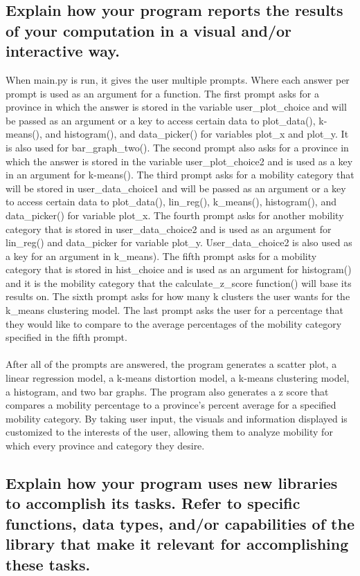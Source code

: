 \documentclass[fontsize=11pt]{article}
\begin{document}
    \subsection{Explain how your program reports the results of your computation in a visual and/or interactive way.
    }
    When main.py is run, it gives the user multiple prompts. Where each answer per prompt is used as an argument for a function. The first prompt asks for a province in which the answer is stored in the variable user\_plot\_choice and will be passed as an argument or a key to access certain data to plot\_data(), k-means(), and histogram(), and data\_picker() for variables plot\_x and plot\_y. It is also used for bar\_graph\_two(). The second prompt also asks for a province in which the answer is stored in the variable user\_plot\_choice2 and is used as a key in an argument for k-means(). The third prompt asks for a mobility category that will be stored in user\_data\_choice1 and will be passed as an argument or a key to access certain data to plot\_data(), lin\_reg(), k\_means(), histogram(), and data\_picker() for variable plot\_x. The fourth prompt asks for another mobility category that is stored in user\_data\_choice2 and is used as an argument for lin\_reg() and data\_picker for variable plot\_y. User\_data\_choice2 is also used as a key for an argument in k\_means). The fifth prompt asks for a mobility category that is stored in hist\_choice and is used as an argument for histogram() and it is the mobility category that the calculate\_z\_score function() will base its results on. The sixth prompt asks for how many k clusters the user wants for the k\_means clustering model. The last prompt asks the user for a percentage that they would like to compare to the average percentages of the mobility category specified in the fifth prompt.\\\\
    After all of the prompts are answered, the program generates a scatter plot, a linear regression model, a k-means distortion model, a k-means clustering model, a histogram, and two bar graphs. The program also generates a z score that compares a mobility percentage to a province’s percent average for a specified mobility category. By taking user input, the visuals and information displayed is customized to the interests of the user, allowing them to analyze mobility for which every province and category they desire.



    \subsection{Explain how your program uses new libraries to accomplish its tasks. Refer to specific functions, data types, and/or capabilities of the library that make it relevant for accomplishing these tasks.
    }
\end{document}
